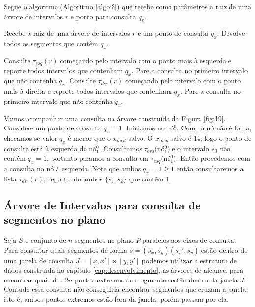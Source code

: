 Segue o algoritmo (Algoritmo \ref{algo:8}) que recebe como parâmetros a raiz de uma árvore de intervalos $r$ e ponto para consulta $q_x$.

\begin{algorithm}[h!]
    \caption{Recebe a raiz de uma árvore de intervalos $r$ e um ponto de consulta $q_x$. Devolve todos os segmentos que contêm $q_x$.}
    \label{algo:8}
    \begin{algorithmic}[1]
                    \State Consulte $\tau_{esq}(r)$ começando pelo intervalo com o ponto mais à esquerda e reporte todos intervalos que contenham $q_x$. Pare a consulta no primeiro intervalo que não contenha $q_x$.
                    \State {}
                \Else
                    \State Consulte $\tau_{dir}(r)$ começando pelo intervalo com o ponto mais à direita e reporte todos intervalos que contenham $q_x$. Pare a consulta no primeiro intervalo que não contenha $q_x$.
                    \State {}
                \EndIf
            \EndIf
        \EndFunction
    \end{algorithmic}
\end{algorithm}

Vamos acompanhar uma consulta na árvore construída da Figura \ref{fig:19}. Considere um ponto de consulta $q_x=1$. Iniciamos no nó$^0_1$. Como o nó não é folha, checamos se valor $q_x$ é menor que o $x_{med}$ salvo. O $x_{med}$ salvo é $14$, logo o ponto de consulta está à esquerda do nó$^0_1$. Consultamos $\tau_{esq}($nó$^0_1)$ e o intervalo $s_3$ não contém $q_x = 1$, portanto paramos a consulta em $\tau_{esq}($nó$^0_1)$. Então procedemos com a consulta no nó à esquerda. Note que ambos $q_x=1 \geq 1$ então consultaremos a lista $\tau_{dir}(r)$; reportando ambos $\{s_1,s_2\}$ que contêm 1.

\subsection{Árvore de Intervalos para consulta de segmentos no plano}

Seja $S$ o conjunto de $n$ segmentos no plano $P$ paralelos aos eixos de consulta. Para consultar quais segmentos de forma $s=(s_x,s_y)(s_x', s_y)$ estão dentro de uma janela de consulta $J = [x, x'] \times [y, y']$ podemos utilizar a estrutura de dados construída no capítulo \ref{cap:desenvolvimento}, as árvores de alcance, para encontrar quais dos $2n$ pontos extremos dos segmentos estão dentro da janela $J$. Contudo essa consulta não conseguiria encontrar segmentos que cruzam a janela, isto é, ambos pontos extremos estão fora da janela, porém passam por ela.

